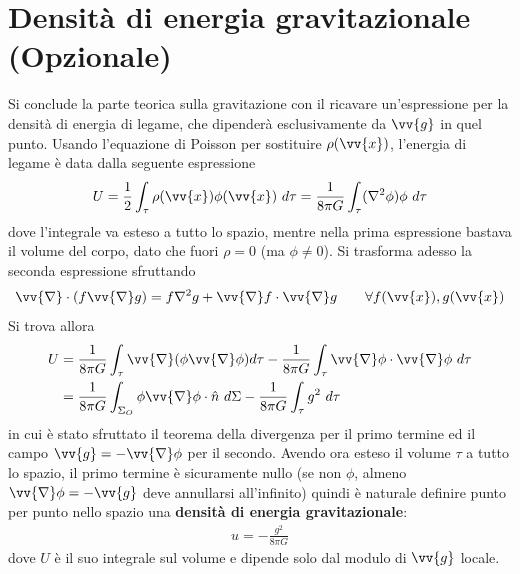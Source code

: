 \documentclass[a4paper, oneside]{book}
\begin{document}
\section{Densità di energia gravitazionale (Opzionale)}
Si conclude la parte teorica sulla gravitazione con il ricavare 
un'espressione per la densità di energia di legame, che dipenderà esclusivamente 
da $\vv{g}$ in quel punto. Usando l'equazione di Poisson per sostituire $\rho(\vv{x} )$, l'energia di legame 
è data dalla seguente espressione
\begin{gather*}
    U = \frac{1}{2}\int_{\tau} \rho(\vv{x} )\phi(\vv{x} ) \ d\tau = \frac{1}{8\pi G}\int_{\tau} (\nabla^{2}\phi) \phi \ d\tau 
\end{gather*} 
dove l'integrale va esteso a tutto lo spazio, mentre nella prima 
espressione bastava il volume del corpo, dato che fuori $\rho = 0$ (ma $\phi \neq  0$). 
Si trasforma adesso la seconda espressione sfruttando 
\begin{gather*}
    \vv{\nabla} \cdot (f\vv{\nabla}g ) = f\nabla^{2}g + \vv{\nabla}f \cdot \vv{\nabla}g \qquad \forall f(\vv{x} ), g(\vv{x}    )
\end{gather*}
Si trova allora 
\begin{align*}
    U &= \frac{1}{8\pi G} \int_{\tau} \vv{\nabla}(\phi \vv{\nabla}\phi ) d\tau - \frac{1}{8\pi G}\int_{\tau} \vv{\nabla}\phi \cdot \vv{\nabla}\phi \ d\tau \\
    &= \frac{1}{8\pi G} \int_{\Sigma_O} \phi \vv{\nabla}\phi \cdot \hat{n} \ d\Sigma - \frac{1}{8\pi G} \int_{\tau} g^{2} \ d\tau   
\end{align*}
in cui è stato sfruttato il teorema della divergenza per il primo termine ed il campo
$\vv{g} = -\vv{\nabla}\phi$ per il secondo. Avendo ora esteso il volume $\tau$ a tutto lo spazio, 
il primo termine è sicuramente nullo (se non $\phi$, almeno $\vv{\nabla}\phi = -\vv{g}$ deve annullarsi all'infinito)  
quindi è naturale definire punto per punto nello spazio una \textbf{densità di energia gravitazionale}:
\begin{align}
    u = -\frac{g^{2}}{8\pi G}
\end{align}
dove $U$ è il suo integrale sul volume e dipende solo dal modulo di $\vv{g}$ locale.
\end{document}
